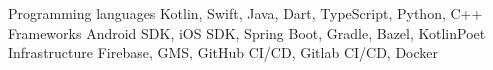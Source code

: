 
\begin{cvskills}
    \cvskill
        {Programming languages}
        {Kotlin, Swift, Java, Dart, TypeScript, Python, C++}
    \cvskill
        {Frameworks} 
        {Android SDK, iOS SDK, Spring Boot, Gradle, Bazel, KotlinPoet}
    \cvskill
        {Infrastructure}
        {Firebase, GMS, GitHub CI/CD, Gitlab CI/CD, Docker}
\end{cvskills}